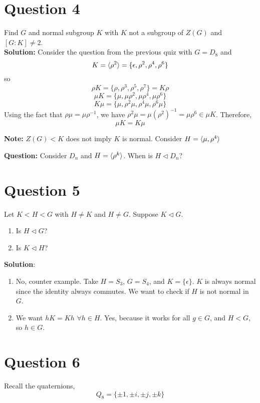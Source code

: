 \documentclass[openany]{report}
\begin{document}
\section{Question 4}
Find $G$ and normal subgroup $K$ with $K$ not a subgroup of $Z(G)$ and $[G :K] \neq 2$. \\[2ex]
\textbf{Solution:}
Consider the question from the previous quiz with $G = D_8$ and 
\[K = \langle \rho^2 \rangle = \{\epsilon, \rho^2,\rho^4, \rho^6\}\]
so
\[\rho K = \{\rho, \rho^3, \rho^5, \rho^7\} = K \rho\]
\[\mu K = \{\mu, \mu\rho^2, \mu\rho^4, \mu\rho^6\}\]
\[K\mu = \{\mu, \rho^2\mu, \rho^4\mu,\rho^6 \mu\}\]
Using the fact that $\rho \mu = \mu\rho^{-1}$, we have $\rho^2 \mu = \mu(\rho^2)^{-1} = \mu\rho^6 \in \mu K$. Therefore, 
\[\mu K = K \mu\]
\begin{center}
\textbf{Note:} $Z(G) < K$ does not imply $K$ is normal. Consider $H = \langle \mu,\rho^4 \rangle$  
\end{center}
\textbf{Question:} Consider $D_n$ and $H = \langle \rho^k \rangle$. When is $H \triangleleft D_n$? 

\section{Question 5}
Let $K < H < G$ with $H \neq K$ and $H \neq G$. Suppose $K \triangleleft G$. 
\begin{enumerate}[label=(\alph*)]
    \item Is $H \triangleleft G$?
    \item Is $K \triangleleft H$?
\end{enumerate}
\noindent
\textbf{Solution}:
\begin{enumerate}[label=(\alph*)]
   \item No, counter example. Take $H = S_3$, $G = S_4$, and $K = \{\epsilon\}$. $K$ is always normal since the identity always commutes. We want to check if $H$ is not normal in $G$.
   \item We want $hK = Kh $ $ \forall h \in H$. Yes, because it works for all $g \in G$, and $H < G$, so $h \in G$. 
\end{enumerate}

\section{Question 6} Recall the quaternions,
\[Q_8 = \{\pm 1, \pm i, \pm j, \pm k\}\]
\end{document}
